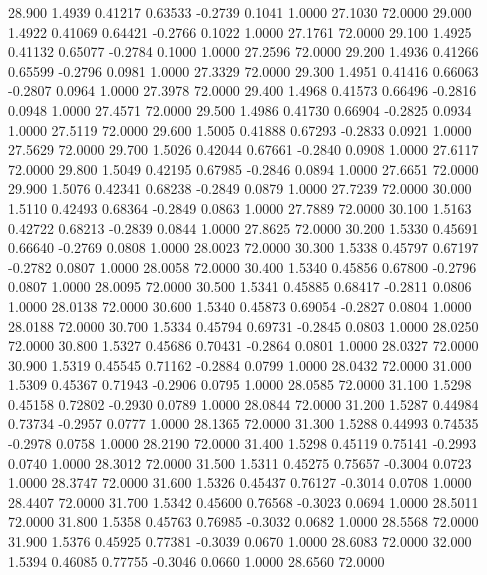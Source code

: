   28.900   1.4939   0.41217   0.63533  -0.2739   0.1041   1.0000  27.1030  72.0000
  29.000   1.4922   0.41069   0.64421  -0.2766   0.1022   1.0000  27.1761  72.0000
  29.100   1.4925   0.41132   0.65077  -0.2784   0.1000   1.0000  27.2596  72.0000
  29.200   1.4936   0.41266   0.65599  -0.2796   0.0981   1.0000  27.3329  72.0000
  29.300   1.4951   0.41416   0.66063  -0.2807   0.0964   1.0000  27.3978  72.0000
  29.400   1.4968   0.41573   0.66496  -0.2816   0.0948   1.0000  27.4571  72.0000
  29.500   1.4986   0.41730   0.66904  -0.2825   0.0934   1.0000  27.5119  72.0000
  29.600   1.5005   0.41888   0.67293  -0.2833   0.0921   1.0000  27.5629  72.0000
  29.700   1.5026   0.42044   0.67661  -0.2840   0.0908   1.0000  27.6117  72.0000
  29.800   1.5049   0.42195   0.67985  -0.2846   0.0894   1.0000  27.6651  72.0000
  29.900   1.5076   0.42341   0.68238  -0.2849   0.0879   1.0000  27.7239  72.0000
  30.000   1.5110   0.42493   0.68364  -0.2849   0.0863   1.0000  27.7889  72.0000
  30.100   1.5163   0.42722   0.68213  -0.2839   0.0844   1.0000  27.8625  72.0000
  30.200   1.5330   0.45691   0.66640  -0.2769   0.0808   1.0000  28.0023  72.0000
  30.300   1.5338   0.45797   0.67197  -0.2782   0.0807   1.0000  28.0058  72.0000
  30.400   1.5340   0.45856   0.67800  -0.2796   0.0807   1.0000  28.0095  72.0000
  30.500   1.5341   0.45885   0.68417  -0.2811   0.0806   1.0000  28.0138  72.0000
  30.600   1.5340   0.45873   0.69054  -0.2827   0.0804   1.0000  28.0188  72.0000
  30.700   1.5334   0.45794   0.69731  -0.2845   0.0803   1.0000  28.0250  72.0000
  30.800   1.5327   0.45686   0.70431  -0.2864   0.0801   1.0000  28.0327  72.0000
  30.900   1.5319   0.45545   0.71162  -0.2884   0.0799   1.0000  28.0432  72.0000
  31.000   1.5309   0.45367   0.71943  -0.2906   0.0795   1.0000  28.0585  72.0000
  31.100   1.5298   0.45158   0.72802  -0.2930   0.0789   1.0000  28.0844  72.0000
  31.200   1.5287   0.44984   0.73734  -0.2957   0.0777   1.0000  28.1365  72.0000
  31.300   1.5288   0.44993   0.74535  -0.2978   0.0758   1.0000  28.2190  72.0000
  31.400   1.5298   0.45119   0.75141  -0.2993   0.0740   1.0000  28.3012  72.0000
  31.500   1.5311   0.45275   0.75657  -0.3004   0.0723   1.0000  28.3747  72.0000
  31.600   1.5326   0.45437   0.76127  -0.3014   0.0708   1.0000  28.4407  72.0000
  31.700   1.5342   0.45600   0.76568  -0.3023   0.0694   1.0000  28.5011  72.0000
  31.800   1.5358   0.45763   0.76985  -0.3032   0.0682   1.0000  28.5568  72.0000
  31.900   1.5376   0.45925   0.77381  -0.3039   0.0670   1.0000  28.6083  72.0000
  32.000   1.5394   0.46085   0.77755  -0.3046   0.0660   1.0000  28.6560  72.0000

